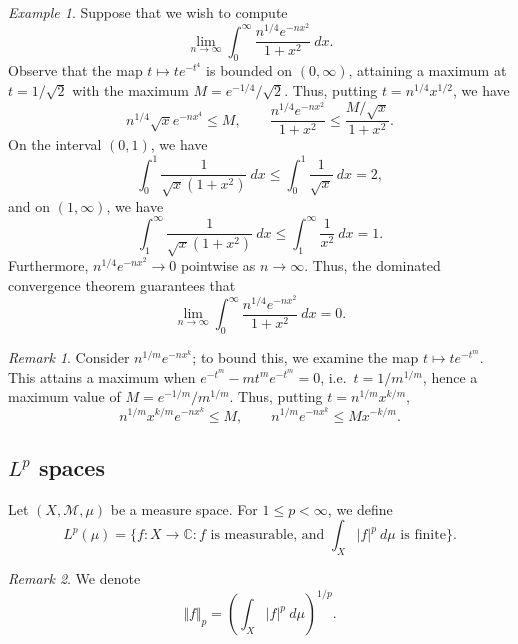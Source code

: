 \documentclass[11pt]{article}
\newcommand{\C}{\mathbb{C}}
\newcommand{\M}{\mathcal{M}}
\newcommand{\norm}[1]{\Vert #1 \Vert}
\theoremstyle{definition}
\theoremstyle{remark}
\newtheorem*{remark}{Remark}
\newtheorem*{example}{Example}
\numberwithin{equation}{section}
\begin{document}
    \begin{example}
        Suppose that we wish to compute \[
            \lim_{n \to \infty} \int_0^\infty \frac{n^{1 / 4}e^{-nx^2}}{1 + x^2}\:dx.
        \] Observe that the map $t \mapsto te^{-t^4}$ is bounded on $(0, \infty)$,
        attaining a maximum at $t = 1 / \sqrt{2}$ with the maximum $M = e^{-1 / 4} /
        \sqrt{2}$.  Thus, putting $t = n^{1 / 4}x^{1 / 2}$, we have \[
            n^{1 / 4}\sqrt{x}e^{-nx^4} \leq M, \qquad
            \frac{n^{1 / 4}e^{-nx^2}}{1 + x^2} \leq \frac{M / \sqrt{x}}{1 + x^2}.
        \] On the interval $(0, 1)$, we have \[
            \int_0^1 \frac{1}{\sqrt{x}(1 + x^2)}\:dx \leq \int_0^1
            \frac{1}{\sqrt{x}}\:dx = 2,
        \] and on $(1, \infty)$, we have \[
            \int_1^\infty \frac{1}{\sqrt{x}(1 + x^2)}\:dx \leq \int_1^\infty
            \frac{1}{x^2}\:dx = 1.
        \] Furthermore, $n^{1 / 4}e^{-nx^2} \to 0$ pointwise as $n \to \infty$. Thus,
        the dominated convergence theorem guarantees that \[
            \lim_{n \to \infty} \int_0^\infty \frac{n^{1 / 4}e^{-nx^2}}{1 + x^2}\:dx
            = 0.
        \] 

        \begin{remark}
            Consider $n^{1 / m}e^{-nx^k}$; to bound this, we examine the map
            $t \mapsto te^{-t^m}$. This attains a maximum when $e^{-t^m} -
            mt^me^{-t^m} = 0$, i.e.\ $t = 1 / m^{1 / m}$, hence a maximum value of $M
            = e^{-1 / m} / m^{1 / m}$. Thus, putting $t = n^{1 / m}x^{k / m}$, \[
                n^{1 / m}x^{k / m} e^{-nx^k} \leq M, \qquad n^{1 / m}e^{-nx^k} \leq
                Mx^{-k / m}.
            \] 
        \end{remark}
    \end{example}

    \subsection{$L^p$ spaces}
    \begin{definition}
        Let $(X, \M, \mu)$ be a measure space. For $1 \leq p < \infty$, we define \[
            L^p(\mu) = \{f\colon X \to \C : f\text{ is measurable, and }\int_X
            |f|^p\:d\mu \text{ is finite}\}.
        \]
        \begin{remark}
            We denote \[
                \norm{f}_p = \left(\int_X |f|^p\:d\mu\right)^{1 / p}.
            \] 
        \end{remark}
    \end{definition}
\end{document}
